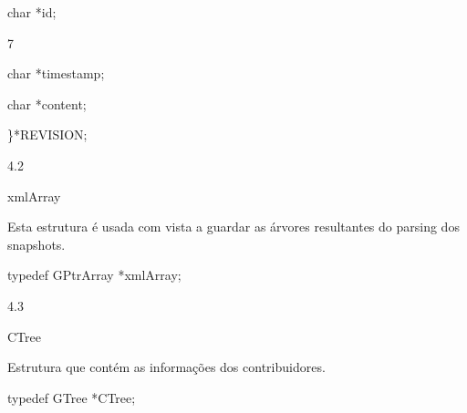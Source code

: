 \documentclass[a4paper,portrait,12pt]{article}
\begin{document}
\begin{flushleft}
char *id;
\end{flushleft}


7





\begin{flushleft}
\newpage
char *timestamp;
\end{flushleft}


\begin{flushleft}
char *content;
\end{flushleft}


\begin{flushleft}
\}*REVISION;
\end{flushleft}





4.2





\begin{flushleft}
xmlArray
\end{flushleft}





\begin{flushleft}
Esta estrutura é usada com vista a guardar as árvores resultantes do parsing dos snapshots.
\end{flushleft}





\begin{flushleft}
typedef GPtrArray *xmlArray;
\end{flushleft}





4.3





\begin{flushleft}
CTree
\end{flushleft}





\begin{flushleft}
Estrutura que contém as informações dos contribuidores.
\end{flushleft}





\begin{flushleft}
typedef GTree *CTree;
\end{flushleft}
\end{document}
